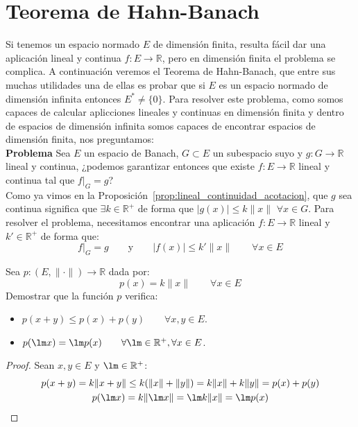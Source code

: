 \section{Teorema de Hahn-Banach}
\noindent
Si tenemos un espacio normado $E$ de dimensión finita, resulta fácil dar una aplicación lineal y continua $f:E\to \mathbb{R}$, pero en dimensión finita el problema se complica. A continuación veremos el Teorema de Hahn-Banach, que entre sus muchas utilidades una de ellas es probar que si $E$ es un espacio normado de dimensión infinita entonces $E^\ast\neq \{0\}$. Para resolver este problema, como somos capaces de calcular aplicciones lineales y continuas en dimensión finita y dentro de espacios de dimensión infinita somos capaces de encontrar espacios de dimensión finita, nos preguntamos:\\

\noindent
\textbf{Problema}\newline
Sea $E$ un espacio de Banach, $G\subset E$ un subespacio suyo y $g:G\to \mathbb{R}$ lineal y continua, ¿podemos garantizar entonces que existe $f:E\to \mathbb{R}$ lineal y continua tal que $f\big|_G = g$?\\

\noindent
Como ya vimos en la Proposición~\ref{prop:lineal_continuidad_acotacion}, que $g$ sea continua significa que $\exists k\in \mathbb{R}^+$ de forma que $|g(x)| \leq k\|x\|$ $\forall x\in G$. Para resolver el problema, necesitamos encontrar una aplicación $f:E\to \mathbb{R}$ lineal y $k'\in \mathbb{R}^+$ de forma que:
\begin{equation*}
    f\big|_G = g \qquad \text{y}\qquad |f(x)| \leq k'\|x\| \qquad \forall x\in E
\end{equation*}

\begin{ejercicio}\label{ej:aplicacion_p}
    Sea $p:(E,\|\cdot \|)\to \mathbb{R}$ dada por:
    \begin{equation*}
        p(x) = k\|x\| \qquad \forall x\in E
    \end{equation*}
    Demostrar que la función $p$ verifica:
    \begin{itemize}
        \item $p(x+y) \leq p(x) + p(y) \qquad \forall x,y\in E$.
        \item $p(\lm x) = \lm p(x) \qquad \forall \lm \in \mathbb{R}^+, \forall x\in E$.
    \end{itemize}
    \begin{proof}
        Sean $x,y\in  E$ y $\lm\in \mathbb{R}^+$:
        \begin{gather*}
            p(x+y)= k\|x+y\| \leq k(\|x\| + \|y\|) = k\|x\| + k\|y\| = p(x) + p(y) \\
            p(\lm x) = k\|\lm x\| = \lm k \|x\| = \lm p(x)
        \end{gather*}
    \end{proof}
\end{ejercicio}


